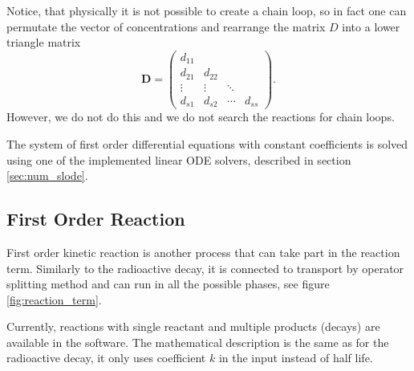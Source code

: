 Notice, that physically it is not possible to create a chain loop, so in fact one can permutate the vector of 
concentrations and rearrange the matrix $D$ into a lower triangle matrix
\[
\mathbf{D} = \begin{pmatrix} d_{11} &  &  &  \\ 
                  d_{21} & d_{22} & &  \\
                  \vdots &\vdots& \ddots &  \\
                  d_{s1} &d_{s2}& \cdots & d_{ss} \end{pmatrix}.
\]
However, we do not do this and we do not search the reactions for chain loops.

The system of first order differential equations with constant coefficients is solved using one of the
implemented linear ODE solvers, described in section \ref{sec:num_slode}.


\subsection{First Order Reaction}
\label{sec:first_order_reaction}
First order kinetic reaction is another process that can take part in the reaction term. Similarly to the
radioactive decay, it is connected to transport by operator splitting method and can run in all the possible
phases, see figure \ref{fig:reaction_term}.

Currently, reactions with single reactant and multiple products (decays) are available in the software.
The mathematical description is the same as for the radioactive decay, it only uses 
 coefficient $k$ in the input instead of half life.







